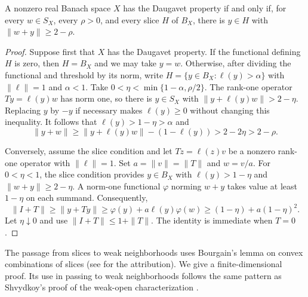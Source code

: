 \begin{lemma}\label{lem:daugavet-slices}
A nonzero real Banach space $X$ has the Daugavet property if and only if,
for every $w\in S_X$, every $\rho>0$, and every slice $H$ of $B_X$,
there is $y\in H$ with $\|w+y\|\ge2-\rho$.
\end{lemma}
\begin{proof}
Suppose first that $X$ has the Daugavet property. If the functional
defining $H$ is zero, then $H=B_X$ and we may take $y=w$. Otherwise,
after dividing the functional and threshold by its norm, write
$H=\{y\in B_X:\ell(y)>\alpha\}$ with $\|\ell\|=1$ and $\alpha<1$.
Take $0<\eta<\min\{1-\alpha,\rho/2\}$. The rank-one operator
$Ty=\ell(y)w$ has norm one, so there is $y\in S_X$ with
$\|y+\ell(y)w\|>2-\eta$. Replacing $y$ by $-y$ if necessary makes
$\ell(y)\ge0$ without changing this inequality. It follows that
$\ell(y)>1-\eta>\alpha$ and
\[
 \|y+w\|\ge\|y+\ell(y)w\|-(1-\ell(y))>2-2\eta>2-\rho.
\]

Conversely, assume the slice condition and let
$Tz=\ell(z)v$ be a nonzero rank-one operator with $\|\ell\|=1$.
Set $a=\|v\|=\|T\|$ and $w=v/a$. For $0<\eta<1$, the slice condition
provides $y\in B_X$ with $\ell(y)>1-\eta$ and
$\|w+y\|\ge2-\eta$. A norm-one functional $\varphi$ norming $w+y$
takes value at least $1-\eta$ on each summand. Consequently,
\[
 \|I+T\|\ge\|y+Ty\|
 \ge\varphi(y)+a\ell(y)\varphi(w)
 \ge(1-\eta)+a(1-\eta)^2.
\]
Let $\eta\downarrow0$ and use $\|I+T\|\le1+\|T\|$.
The identity is immediate when $T=0$.
\end{proof}

The passage from slices to weak neighborhoods uses Bourgain's lemma
on convex combinations of slices
(see \cite{ANP2019} for the attribution).
We give a finite-dimensional proof.  Its use in passing to weak
neighborhoods follows the same pattern as Shvydkoy's proof of the
weak-open characterization \cite[Lemma~3]{Shvydkoy2000}.

